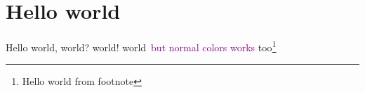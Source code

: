\documentclass{article}
\begin{document}
\def\world{world}
\section{Hello world}

Hello world, world? world! \world\  \textcolor{purple}{but normal colors works} too\footnote{Hello world from footnote}

\lipsum[1-12]
\end{document}
